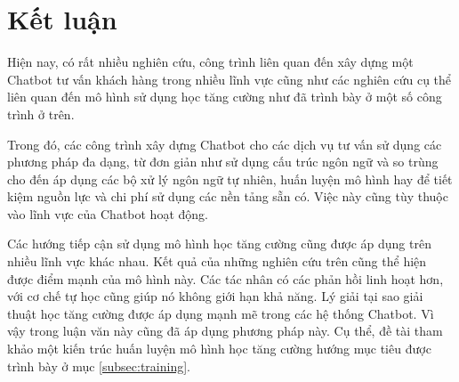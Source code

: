 \section{Kết luận}
Hiện nay, có rất nhiều nghiên cứu, công trình liên quan đến xây dựng
một Chatbot tư vấn khách hàng trong nhiều lĩnh vực cũng như các
nghiên cứu cụ thể liên quan đến mô hình sử dụng học tăng cường như
đã trình bày ở một số công trình ở trên.

Trong đó, các công trình xây dựng Chatbot cho các dịch vụ tư vấn
sử dụng các phương pháp đa dạng, từ đơn giản như sử dụng cấu trúc
ngôn ngữ và so trùng cho đến áp dụng các bộ xử lý ngôn ngữ tự nhiên,
huấn luyện mô hình hay để tiết kiệm nguồn lực và chi phí sử dụng
các nền tảng sẵn có. Việc này cũng tùy thuộc vào lĩnh vực của
Chatbot hoạt động.

Các hướng tiếp cận sử dụng mô hình học tăng cường cũng được áp dụng
trên nhiều lĩnh vực khác nhau. Kết quả của những nghiên cứu trên
cũng thể hiện được điểm mạnh của mô hình này. Các tác nhân có các
phản hồi linh hoạt hơn, với cơ chế tự học cũng giúp nó không
giới hạn khả năng. Lý giải tại sao giải thuật học tăng cường được
áp dụng mạnh mẽ trong các hệ thống Chatbot. Vì vậy trong luận văn
này cũng đã áp dụng phương pháp này. Cụ thể, đề tài tham khảo một
kiến trúc huấn luyện mô hình học tăng cường hướng mục tiêu được
trình bày ở mục \ref{subsec:training}.
